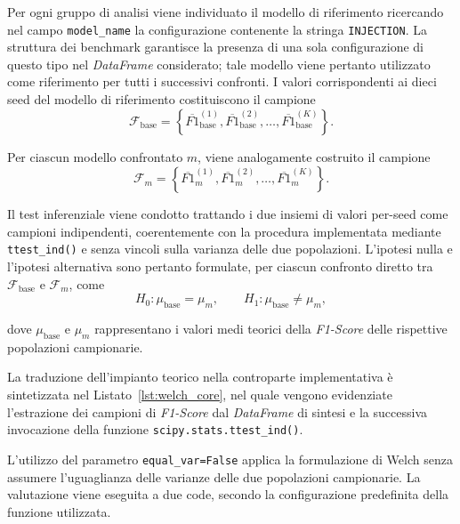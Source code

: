 Per ogni gruppo di analisi viene individuato il modello di riferimento ricercando nel campo \texttt{model\_name} la configurazione contenente la stringa \texttt{INJECTION}. 
La struttura dei benchmark garantisce la presenza di una sola configurazione di questo tipo nel \textit{DataFrame} considerato; tale modello viene pertanto utilizzato come riferimento per tutti i successivi confronti. 
I valori corrispondenti ai dieci seed del modello di riferimento costituiscono il campione
\begin{equation}
\mathcal{F}_{\text{base}}
=
\left\{
\overline{F1}_{\text{base}}^{(1)},
\overline{F1}_{\text{base}}^{(2)},
\ldots,
\overline{F1}_{\text{base}}^{(K)}
\right\}.
\label{eq:welch_reference_sample}
\end{equation}

Per ciascun modello confrontato $m$, viene analogamente costruito il campione
\begin{equation}
\mathcal{F}_{m}
=
\left\{
\overline{F1}_{m}^{(1)},
\overline{F1}_{m}^{(2)},
\ldots,
\overline{F1}_{m}^{(K)}
\right\}.
\label{eq:welch_model_sample}
\end{equation}

Il test inferenziale viene condotto trattando i due insiemi di valori per-seed come campioni indipendenti, coerentemente con la procedura implementata mediante \texttt{ttest\_ind()} e senza vincoli sulla varianza delle due popolazioni. L'ipotesi nulla e l'ipotesi alternativa sono pertanto formulate, per ciascun confronto diretto tra $\mathcal{F}_{\text{base}}$ e $\mathcal{F}_{m}$, come
\begin{equation}
H_0:
\mu_{\text{base}} = \mu_m,
\qquad
H_1:
\mu_{\text{base}} \neq \mu_m,
\label{eq:welch_hypotheses}
\end{equation}

dove $\mu_{\text{base}}$ e $\mu_m$ rappresentano i valori medi teorici della \textit{F1-Score} delle rispettive popolazioni campionarie. 

La traduzione dell'impianto teorico nella controparte implementativa è sintetizzata nel Listato~\ref{lst:welch_core}, nel quale vengono evidenziate l'estrazione dei campioni di \textit{F1-Score} dal \textit{DataFrame} di sintesi e la successiva invocazione della funzione \texttt{scipy.stats.ttest\_ind()}.

L'utilizzo del parametro \texttt{equal\_var=False} applica la formulazione di Welch senza assumere l'uguaglianza delle varianze delle due popolazioni campionarie. 
La valutazione viene eseguita a due code, secondo la configurazione predefinita della funzione utilizzata.

